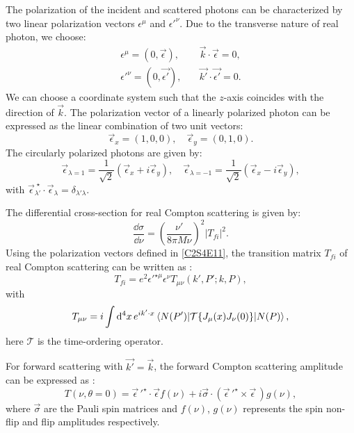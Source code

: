 The polarization of the incident and scattered photons can be characterized by two linear polarization vectors $\epsilon^\mu$ and $\epsilon'^\nu$. Due to the transverse nature of real photon, we choose:
\begin{equation} \label{C2S4E11}
\begin{split}
\epsilon^\mu = (0,\vec{\epsilon}), & \quad \vec{k}\cdot\vec{\epsilon} = 0, \\
\epsilon'^\nu = (0,\vec{\epsilon'}), & \quad \vec{k'}\cdot\vec{\epsilon'} = 0.
\end{split}
\end{equation}
We can choose a coordinate system such that the $z$-axis coincides with the direction of $\vec{k}$. The polarization vector of a linearly polarized photon can be expressed as the linear combination of two unit vectors:
\begin{equation} \label{C2S4E12}
\vec{\epsilon}_x = (1,0,0), \quad \vec{\epsilon}_y = (0,1,0).
\end{equation}
The circularly polarized photons are given by:
\begin{equation} \label{C2S4E13}
\vec{\epsilon}_{\lambda=1} = \frac{1}{\sqrt{2}}(\vec{\epsilon}_x+i\vec{\epsilon}_y), \quad \vec{\epsilon}_{\lambda=-1} = \frac{1}{\sqrt{2}}(\vec{\epsilon}_x-i\vec{\epsilon}_y),
\end{equation}
with $\vec{\epsilon}^{\;\star}_{\lambda'}\cdot\vec{\epsilon}_{\lambda}=\delta_{\lambda'\lambda}$.

The differential cross-section for real Compton scattering is given by:
\begin{equation} \label{C2S4E14}
\frac{\dd{\sigma}}{\dd{\nu}} = \left(\frac{\nu'}{8\pi M\nu}\right)^2|T_{fi}|^2.
\end{equation}
Using the polarization vectors defined in \cref{C2S4E11}, the transition matrix $T_{fi}$ of real Compton scattering can be written as \cite{Thomas2001}:
\begin{equation} \label{C2S4E15}
T_{fi} = e^2\epsilon'^{\star\mu}\epsilon^\nu T_{\mu\nu}(k',P';k,P),
\end{equation}
with
\begin{equation} \label{C2S4E16}
T_{\mu\nu} = i\int\dd[4]{x}e^{ik'\cdot x}\mel{N(P')}{\mathcal{T}\{J_\mu(x)J_\nu(0)\}}{N(P)},
\end{equation}
here $\mathcal{T}$ is the time-ordering operator.

For forward scattering with $\vec{k'}=\vec{k}$, the forward Compton scattering amplitude can be expressed as \cite{Drechsel2003}:
\begin{equation} \label{C2S4E17}
T(\nu,\theta=0) = \vec{\epsilon}\,'^\star\cdot\vec{\epsilon}f(\nu)+i\vec{\sigma}\cdot(\vec{\epsilon}\,'^\star\times\vec{\epsilon}\,)g(\nu),
\end{equation}
where $\vec{\sigma}$ are the Pauli spin matrices and $f(\nu)$, $g(\nu)$ represents the spin non-flip and flip amplitudes respectively.

